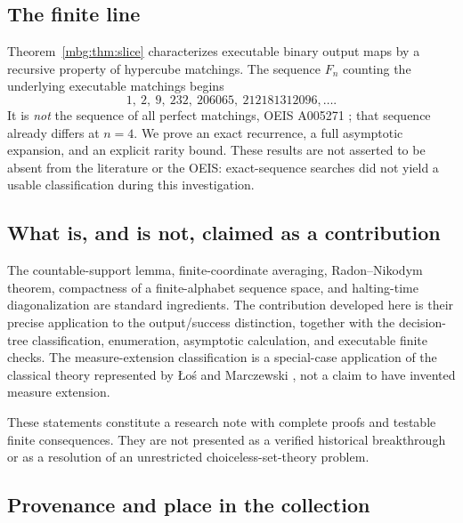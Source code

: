 \documentclass[11pt,letterpaper]{article}
\theoremstyle{definition}
\begin{document}
\subsection{The finite line}
Theorem~\ref{mbg:thm:slice} characterizes executable binary output maps by a recursive property of hypercube matchings. The sequence $F_n$ counting the underlying executable matchings begins
\[
1,\ 2,\ 9,\ 232,\ 206065,\ 212181312096,\ldots.
\]
It is \emph{not} the sequence of all perfect matchings, OEIS A005271 \cite{OEIS}; that sequence already differs at $n=4$. We prove an exact recurrence, a full asymptotic expansion, and an explicit rarity bound. These results are not asserted to be absent from the literature or the OEIS: exact-sequence searches did not yield a usable classification during this investigation.

\subsection{What is, and is not, claimed as a contribution}
The countable-support lemma, finite-coordinate averaging, Radon--Nikodym theorem, compactness of a finite-alphabet sequence space, and halting-time diagonalization are standard ingredients. The contribution developed here is their precise application to the output/success distinction, together with the decision-tree classification, enumeration, asymptotic calculation, and executable finite checks. The measure-extension classification is a special-case application of the classical theory represented by \L o\'s and Marczewski \cite{LosMarczewski}, not a claim to have invented measure extension.

These statements constitute a research note with complete proofs and testable finite consequences. They are not presented as a verified historical breakthrough or as a resolution of an unrestricted choiceless-set-theory problem.

\subsection{Provenance and place in the collection}
\label{mbg:sec:provenance}
\end{document}
